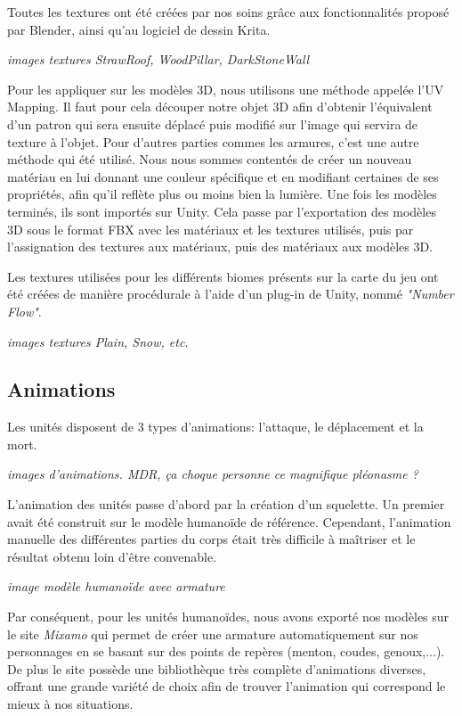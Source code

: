 \documentclass[12pt]{report}
\begin{document}
Toutes les textures ont été créées par nos soins grâce aux fonctionnalités proposé par 
Blender, ainsi qu’au logiciel de dessin Krita. 

\textit{images textures StrawRoof, WoodPillar, DarkStoneWall}

Pour les appliquer sur les modèles 3D, nous utilisons une méthode appelée l’UV Mapping. 
Il faut pour cela découper notre objet 3D afin d’obtenir l’équivalent d’un patron qui sera 
ensuite déplacé puis modifié sur l’image qui servira de texture à l’objet. Pour d’autres 
parties commes les armures, c’est une autre méthode qui  été utilisé. Nous nous sommes 
contentés de créer un nouveau matériau en lui donnant une couleur spécifique et en 
modifiant certaines de ses propriétés, afin qu’il reflète plus ou moins bien la lumière. Une 
fois les modèles terminés, ils sont importés sur Unity. Cela passe par l’exportation des 
modèles 3D sous le format FBX avec les matériaux et les textures utilisés, puis par l’assignation 
des textures aux matériaux, puis des matériaux aux modèles 3D.

Les textures utilisées pour les différents biomes présents sur la carte du jeu ont été créées de 
manière procédurale à l’aide d’un plug-in de Unity, nommé \textit{"Number Flow"}.

\textit{images textures Plain, Snow, etc.}

\subsection{Animations}

Les unités disposent de 3 types d’animations: l’attaque, le déplacement et la mort.

\textit{images d'animations. MDR, ça choque personne ce magnifique pléonasme ?}

L’animation des unités passe d’abord par la création d’un squelette. Un premier avait été 
construit sur le modèle humanoïde de référence. Cependant, l’animation manuelle des 
différentes parties du corps était très difficile à maîtriser et le résultat obtenu loin d’être 
convenable.

\textit{image modèle humanoïde avec armature}

Par conséquent, pour les unités humanoïdes, nous avons exporté nos modèles sur le site 
\textit{Mixamo} qui permet de créer une armature automatiquement sur nos personnages 
en se basant sur des points de repères (menton, coudes, genoux,...). De plus le site possède 
une bibliothèque très complète d’animations diverses, offrant une grande variété de choix afin 
de trouver l’animation qui correspond le mieux à nos situations.
\end{document}
